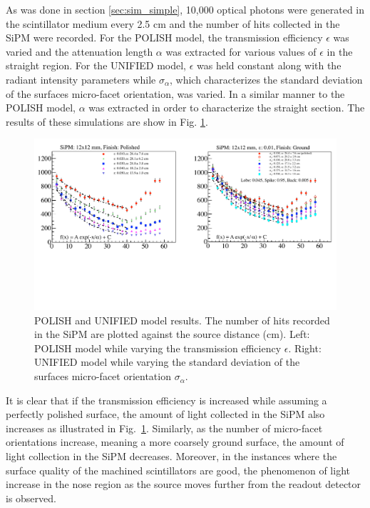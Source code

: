 As was done in section \ref{sec:sim_simple}, 10,000 optical photons were generated in the scintillator medium every 2.5 cm and the number of hits collected in the SiPM were recorded.  For the POLISH model, the transmission efficiency $\epsilon$ was varied and the attenuation length $\alpha$ was extracted for various values of $\epsilon$ in the straight region.  For the UNIFIED model, $\epsilon$ was held constant along with the radiant intensity parameters while $\sigma_{\alpha}$, which characterizes the standard deviation of the surfaces micro-facet orientation, was varied.  In a similar manner to the POLISH model, $\alpha$ was extracted in order to characterize the straight section.  The results of these simulations are show in Fig. \ref{fig:transm_eff_vs_sig_alpha}.
	\begin{figure}[!htb]
	\centering
	\includegraphics[width=1.0\columnwidth]{simulation/figs/transm_eff_vs_sig_alpha}
	\caption{POLISH and UNIFIED model results.  The number of hits recorded in the SiPM are plotted against the source distance (cm).  Left: POLISH model while varying the transmission efficiency $\epsilon$.  Right: UNIFIED model while varying the standard deviation of the surfaces micro-facet orientation $\sigma_{\alpha}$.}
	\label{fig:transm_eff_vs_sig_alpha}
	\end{figure}

It is clear that if the transmission efficiency is increased while assuming a perfectly polished surface, the amount of light collected in the SiPM also increases as illustrated in Fig.~\ref{fig:transm_eff_vs_sig_alpha}.  Similarly, as the number of micro-facet orientations increase, meaning a more coarsely ground surface, the amount of light collection in the SiPM decreases.  Moreover, in the instances where the surface quality of the machined scintillators are good, the phenomenon of light increase in the nose region as the source moves further from the readout detector is observed.